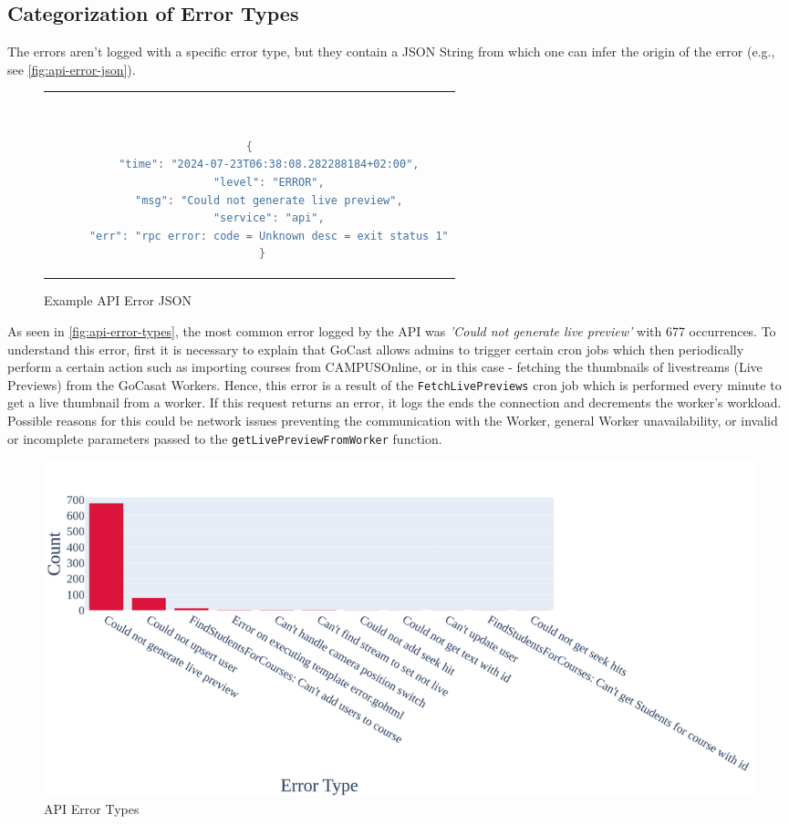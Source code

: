 \subsection{Categorization of Error Types}

The errors aren't logged with a specific error type, but they contain a JSON String from which one can infer the origin of the error (e.g., see \autoref{fig:api-error-json}).

\begin{figure}[htpb]
  \begin{tabular}{c}
  \ \small \begin{lstlisting}[language=Java]
    {
      "time": "2024-07-23T06:38:08.282288184+02:00",
      "level": "ERROR",
      "msg": "Could not generate live preview",
      "service": "api",
      "err": "rpc error: code = Unknown desc = exit status 1"
    }
    \end{lstlisting}
  \end{tabular}
  \caption[Example API Error JSON]{Example API Error JSON}\label{fig:api-error-json}
\end{figure}

As seen in \autoref{fig:api-error-types}, the most common error logged by the \ac{API} was \textit{'Could not generate live preview'} with 677 occurrences. To understand this error, first it is necessary to explain that GoCast allows admins to trigger certain cron jobs which then periodically perform a certain action such as importing courses from CAMPUSOnline, or in this case - fetching the thumbnails of livestreams (Live Previews) from the GoCasat Workers. Hence, this error is a result of the \texttt{FetchLivePreviews} cron job which is performed every minute to get a live thumbnail from a worker. If this request returns an error, it logs the  ends the connection and decrements the worker's workload. Possible reasons for this could be network issues preventing the communication with the Worker, general Worker unavailability, or invalid or incomplete parameters passed to the \texttt{getLivePreviewFromWorker} function.

\begin{figure}[htpb]
    \centering
    \includegraphics[width=\linewidth]{images/plots/api/error_types.png}
    \caption[\ac{API} Error Types]{\ac{API} Error Types}\label{fig:api-error-types}
\end{figure}

